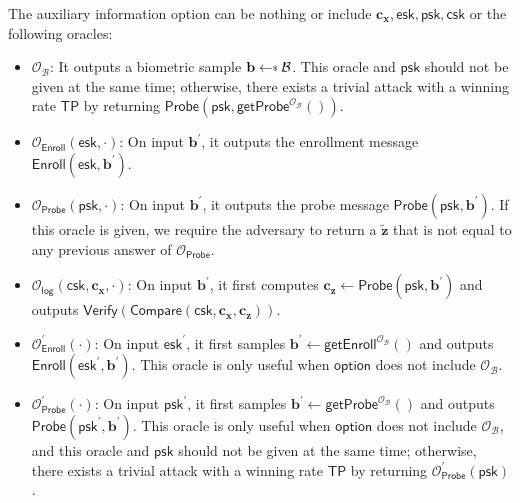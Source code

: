The auxiliary information \textsf{option} can be nothing or include $\mathbf{c_x}, \textsf{esk}, \textsf{psk}, \textsf{csk}$ or the following oracles:

\begin{itemize}

	\item $\mathcal{O}_{\mathcal{B}}$: It outputs a biometric sample $\mathbf{b} \getsdollar \mathcal{B}$. This oracle and $\textsf{psk}$ should not be given at the same time; otherwise, there exists a trivial attack with a winning rate $\textsf{TP}$ by returning $\textsf{Probe}(\textsf{psk}, \textsf{getProbe}^{ \mathcal{O}_\mathcal{B} }() )$.
	
	\item $\mathcal{O}_\textsf{Enroll}(\textsf{esk}, \cdot)$: On input $\mathbf{b}^\prime$, it outputs the enrollment message $\textsf{Enroll}(\textsf{esk}, \mathbf{b}^\prime)$.

	\item $\mathcal{O}_\textsf{Probe}(\textsf{psk}, \cdot)$: On input $\mathbf{b}^\prime$, it outputs the probe message $\textsf{Probe}(\textsf{psk}, \mathbf{b}^\prime)$. If this oracle is given, we require the adversary to return a $\mathbf{\tilde{z}}$ that is not equal to any previous answer of $\mathcal{O}_\textsf{Probe}$.
	
	\item $\mathcal{O}_\textsf{log}(\textsf{csk}, \mathbf{c_x}, \cdot)$: On input $\mathbf{b}^\prime$, it first computes $\mathbf{c_z} \gets \textsf{Probe}(\textsf{psk}, \mathbf{b}^\prime)$ and outputs $\textsf{Verify}(\textsf{Compare}(\textsf{csk}, \mathbf{c_x}, \mathbf{c_z} ) )$.
	
	\item $\mathcal{O}_\textsf{Enroll}^\prime (\cdot)$: On input $\textsf{esk}^\prime$, it first samples $\mathbf{b}^\prime \gets \textsf{getEnroll}^{\mathcal{O}_{\mathcal{B}}}()$ and outputs $\textsf{Enroll}(\textsf{esk}^\prime, \mathbf{b}^\prime)$. This oracle is only useful when $\textsf{option}$ does not include $\mathcal{O}_{\mathcal{B}}$.

	\item $\mathcal{O}_\textsf{Probe}^\prime (\cdot)$: On input $\textsf{psk}^\prime$, it first samples $\mathbf{b}^\prime \gets \textsf{getProbe}^{\mathcal{O}_{\mathcal{B}}}()$ and outputs $\textsf{Probe}(\textsf{psk}^\prime, \mathbf{b}^\prime)$. This oracle is only useful when $\textsf{option}$ does not include $\mathcal{O}_{\mathcal{B}}$, and this oracle and $\textsf{psk}$ should not be given at the same time; otherwise, there exists a trivial attack with a winning rate $\textsf{TP}$ by returning $\mathcal{O}_{\textsf{Probe}}^\prime (\textsf{psk})$.
	
\end{itemize}


